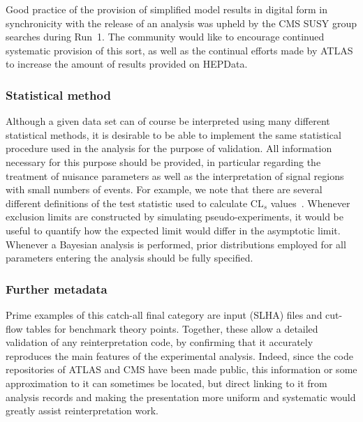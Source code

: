 \documentclass[a4paper,aps,prd,longbibliography,notitlepage,showpacs,amsmath,amssymb,superscriptaddress,nofootinbib,floatfix,11pt,preprintnumbers]{revtex4-1-mod}
\newcommand{\hepdata}{\textsf{HEPData}\xspace}
\begin{document}
Good practice of the provision of simplified model results in digital form in synchronicity with the release of an analysis was upheld by the CMS SUSY group searches during Run~1. The community would like to encourage continued systematic provision of this sort, as well as the continual efforts made by ATLAS to increase the amount of results provided on \hepdata.


\subsubsection{Statistical method}\label{sec:statmet}

Although a given data set can of course be interpreted using many different statistical methods, it is desirable to be able to implement the same statistical procedure used in the analysis for the purpose of validation. All information necessary for this purpose should be provided, in particular regarding the treatment of nuisance parameters as well as the interpretation of signal regions with small numbers of events. For example, we note that there are several different definitions of the test statistic used to calculate $\text{CL}_s$ values~\cite{ATLAS:2011tau}. Whenever exclusion limits are constructed by simulating pseudo-experiments, it would be useful to quantify how the expected limit would differ in the asymptotic limit. Whenever a Bayesian analysis is performed, prior distributions employed for all parameters entering the analysis should be fully specified.

\subsubsection{Further metadata}

Prime examples of this catch-all final category are input (\textsf{SLHA}) files
and cut-flow tables for benchmark theory points. Together, these allow a detailed validation of any reinterpretation code, by confirming that it accurately reproduces the main features of the experimental analysis.
Indeed, since the code repositories of ATLAS and CMS have been made public, this information or some approximation to it can sometimes be located, but direct linking to it from analysis records and making the presentation more uniform and systematic would greatly assist reinterpretation work. \\
\end{document}
